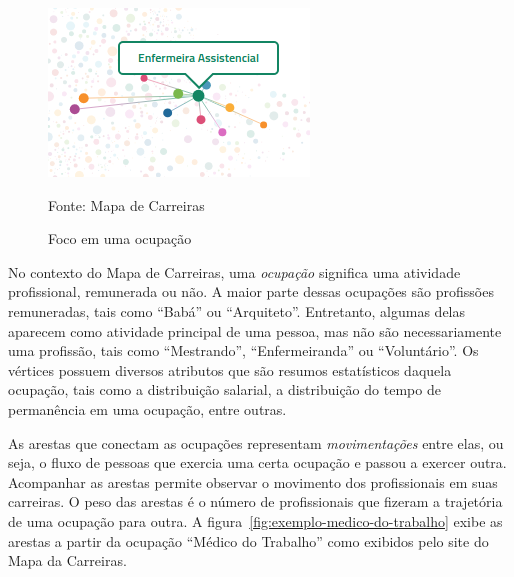 \documentclass[12pt,a4paper]{article}
\theoremstyle{hypo}
\newcommand{\source}[1]{\vspace{-10pt} \caption*{Fonte: {#1}} }
\begin{document}
\begin{figure}[ht]
  \centering
  \includegraphics[scale=0.8, frame]{mapa-enfermeira-assistencial.png}
  \caption{Foco em uma ocupação}
  \source{Mapa de Carreiras}
  \label{fig:exemplo-grafo}
\end{figure}


No contexto do Mapa de Carreiras, uma \textit{ocupação} significa uma atividade profissional, remunerada ou não. A maior parte dessas ocupações são profissões remuneradas, tais como \enquote{Babá} ou \enquote{Arquiteto}. Entretanto, algumas delas aparecem como atividade principal de uma pessoa, mas não são necessariamente uma profissão, tais como \enquote{Mestrando}, \enquote{Enfermeiranda} ou \enquote{Voluntário}. Os vértices possuem diversos atributos que são resumos estatísticos daquela ocupação, tais como a distribuição salarial, a distribuição do tempo de permanência em uma ocupação, entre outras.


As arestas que conectam as ocupações representam \textit{movimentações} entre elas, ou seja, o fluxo de pessoas que exercia uma certa ocupação e passou a exercer outra. Acompanhar as arestas permite observar o movimento dos profissionais em suas carreiras. O peso das arestas é o número de profissionais que fizeram a trajetória de uma ocupação para outra. A figura~\ref{fig:exemplo-medico-do-trabalho} exibe as arestas a partir da ocupação \enquote{Médico do Trabalho} como exibidos pelo site do Mapa da Carreiras.
\end{document}
